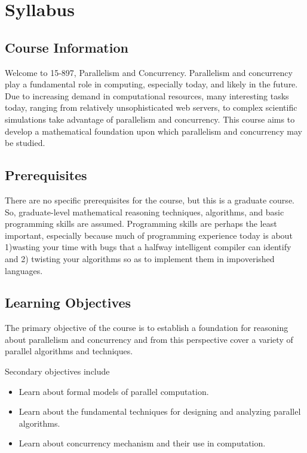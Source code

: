 \chapter{Syllabus}

\section{Course Information}

Welcome to 15-897, Parallelism and Concurrency. 
%
Parallelism and concurrency play a  fundamental role in computing, especially today, and likely in the future.
%
Due to increasing demand in computational resources, many interesting tasks today, ranging from relatively unsophisticated web servers, to complex scientific simulations take advantage of parallelism and concurrency.
%
This course aims to develop a mathematical foundation upon which parallelism and concurrency may be studied.  
%
 
\section{Prerequisites}
There are no specific prerequisites for the course, but this is a graduate course.
%
So, graduate-level mathematical reasoning techniques, algorithms, and basic programming skills are assumed.
%
Programming skills are perhaps the least important, especially because much of programming experience today is about 1)wasting your time with bugs that a halfway intelligent compiler can identify and 2) twisting your algorithms so as to implement them in impoverished languages.
%

\section{Learning Objectives}

The primary objective of the course is to establish a foundation for reasoning about parallelism and concurrency and from this perspective cover a variety of parallel algorithms and techniques.

Secondary objectives include
\begin{itemize}
\item Learn about formal models of parallel computation.
\item Learn about the fundamental techniques for designing and analyzing parallel algorithms.
\item Learn about concurrency mechanism and their use in computation. 
\end{itemize}


